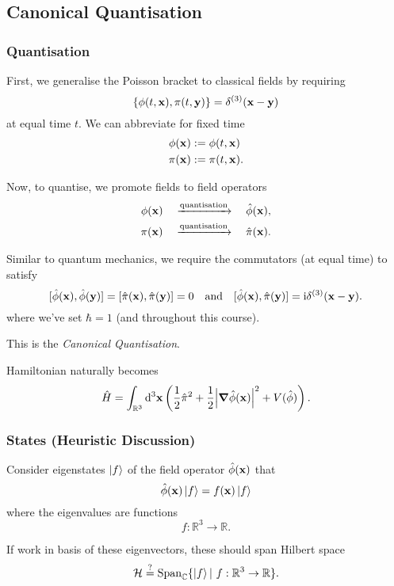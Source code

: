 \documentclass[a4paper,11pt]{article}
\begin{document}
	\subsection{Canonical Quantisation}

	\subsubsection{Quantisation}

	First, we generalise the Poisson bracket to classical fields by requiring
	\[
		\{\phi(t,\vb x), \pi(t, \vb y)\} = \delta ^{(3)}(\vb x - \vb y)
	\]
	at equal time $t$. We can abbreviate for fixed time
	\begin{align*}
		\phi(\vb x) & := \phi(t, \vb x)\\
		\pi(\vb x) & := \pi(t, \vb x).
	\end{align*}

	Now, to quantise, we promote fields to field operators
	\begin{align*}
		\phi(\vb x) \quad \xrightarrow{\text{quantisation}} \quad \hat \phi(\vb x),\\
		\pi(\vb x) \quad \xrightarrow{\text{quantisation}} \quad \hat \pi(\vb x).
	\end{align*}
	
	Similar to quantum mechanics, we require the commutators (at equal time) to satisfy
	\[
		[\hat \phi(\vb x), \hat \phi(\vb y)] = [\hat \pi(\vb x), \hat \pi(\vb y)] = 0 \quad \text{and} \quad [\hat \phi(\vb x), \hat \pi(\vb y)] = \mathrm{i} \delta ^{(3)}(\vb x - \vb y).
	\]
	where we've set $\hbar = 1$ (and throughout this course).

	This is the \emph{Canonical Quantisation}.

	Hamiltonian naturally becomes
	\[
		\hat H = \int _{\mathbb{R}^3} \dd[3]{\vb x} \left( \frac{1}{2} \hat \pi^2 + \frac{1}{2} \abs{\grad \hat \phi (\vb x)}^2 + V(\hat \phi) \right).
	\]
	
	\subsubsection{States (Heuristic Discussion)}

	Consider eigenstates $\ket{f}$ of the field operator $\hat \phi(\vb x)$ that
	\[
		\hat \phi(\vb x) \ket{f} = f(\vb x)\ket{f}
	\]
	where the eigenvalues are functions
	\[
		f: \mathbb{R}^3 \to \mathbb{R}.
	\]
	
	If work in basis of these eigenvectors, these should span Hilbert space
	\[
		\mathcal{H} \overset{?}{=} \operatorname{Span} _{\mathbb{C}} \{\ket{f} |\ f : \mathbb{R}^3 \to \mathbb{R}\}.
	\]
\end{document}
